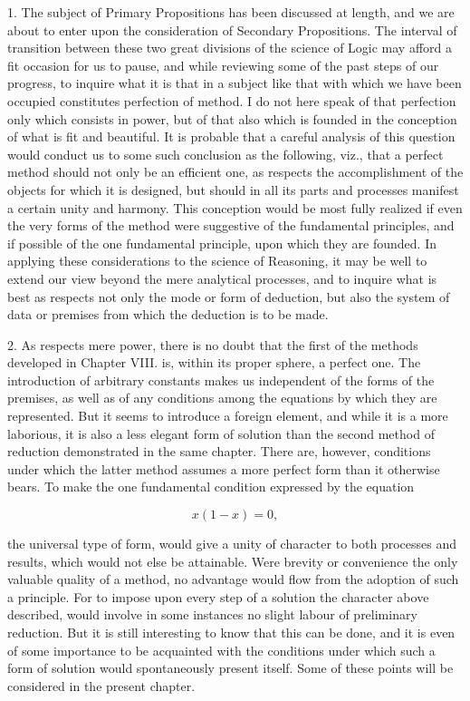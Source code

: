 \documentclass[oneside]{book}
\begin{document}
1. The subject of Primary Propositions has been discussed at
length, and we are about to enter upon the consideration
of Secondary Propositions. The interval of transition between
these two great divisions of the science of Logic may afford a fit
occasion for us to pause, and while reviewing some of the past
steps of our progress, to inquire what it is that in a subject like
that with which we have been occupied constitutes perfection of
method. I do not here speak of that perfection only which
consists in power, but of that also which is founded in the conception
of what is fit and beautiful. It is probable that a careful analysis
of this question would conduct us to some such conclusion as the
following, viz., that a perfect method should not only be an efficient
one, as respects the accomplishment of the objects for which
it is designed, but should in all its parts and processes manifest
a certain unity and harmony. This conception would be most
fully realized if even the very forms of the method were suggestive
of the fundamental principles, and if possible of the one fundamental
principle, upon which they are founded. In applying
these considerations to the science of Reasoning, it may be well
to extend our view beyond the mere analytical processes, and to
inquire what is best as respects not only the mode or form of
deduction, but also the system of data or premises from which
the deduction is to be made.

2. As respects mere power, there is no doubt that the first
of the methods developed in Chapter VIII. is, within its proper
sphere, a perfect one. The introduction of arbitrary constants
makes us independent of the forms of the premises, as well as of
any conditions among the equations by which they are represented.
But it seems to introduce a foreign element, and while
it is a more laborious, it is also a less elegant form of solution
than the second method of reduction demonstrated in the same
chapter. There are, however, conditions under which the latter
method assumes a more perfect form than it otherwise bears. To
make the one fundamental condition expressed by the equation

\[
x(1-x) = 0,
\]

the universal type of form, would give a unity of character to
both processes and results, which would not else be attainable.
Were brevity or convenience the only valuable quality of a method,
no advantage would flow from the adoption of such a principle.
For to impose upon every step of a solution the character
above described, would involve in some instances no slight labour
of preliminary reduction. But it is still interesting to know
that this can be done, and it is even of some importance to be
acquainted with the conditions under which such a form of solution
would spontaneously present itself. Some of these points
will be considered in the present chapter.
\end{document}
